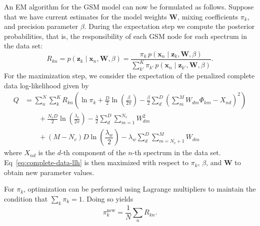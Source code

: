 An EM algorithm for the GSM model can now be formulated as follows. Suppose that
we have current estimates for the model weights $\mathbf{W}$, mixing
coefficients $\pi_k$, and precision parameter $\beta$. During the expectation
step we compute the posterior probabilities, that is, the responsibility of each
GSM node for each spectrum in the data set:
\begin{equation}\label{eq:responsibility}
    R_{kn}  = p(\mathbf{z}_k \mid \mathbf{x}_n, \mathbf{W}, \beta) = \dfrac{\pi_k \, p(\mathbf{x}_n \mid \mathbf{z}_k, \mathbf{W}, \beta)}{\sum\limits_{k'}^K \pi_{k'} \, p(\mathbf{x}_n \mid \mathbf{z}_{k'}, \mathbf{W}, \beta)}.
\end{equation}
For the maximization step, we consider the expectation of the penalized
complete data log-likelihood given by
\begin{equation}\label{eq:complete-data-llh}
\begin{aligned}
    Q &= \sum_n^N\sum_k^K R_{kn} \left(\ln\pi_k + \frac{D}{2}\ln\left(\frac{\beta}{2\pi}\right) - \frac{\beta}{2}\sum_d^D\left(\sum_m^M W_{dm}\Phi_{km} - X_{nd}\right)^2\right) \\
    &\qquad + \frac{N_vD}{2}\ln\left(\frac{\lambda_e}{2\pi}\right) - \frac{\lambda}{2}\sum_d^D \sum_{m=1}^{N_v} W_{dm}^2  \\
    &\qquad + (M-N_v)D\ln\left(\dfrac{\lambda_w}{2}\right) - \lambda_w\sum_d^D\sum_{m=N_v+1}^{M} W_{dm}
\end{aligned}
\end{equation}
where $X_{nd}$ is the $d$-th component of the $n$-th spectrum in the data set.
Eq~\ref{eq:complete-data-llh} is then maximized with respect to $\pi_k$,
$\beta$, and $\mathbf{W}$ to obtain new parameter values.

For $\pi_k$, optimization can be performed using Lagrange multipliers to
maintain the condition that $\sum_k\pi_k=1$. Doing so yields
\begin{equation}\label{eq:pi-update}
    \pi_k^{\text{new}}  = \frac{1}{N}\sum_n R_{kn}.
\end{equation}

